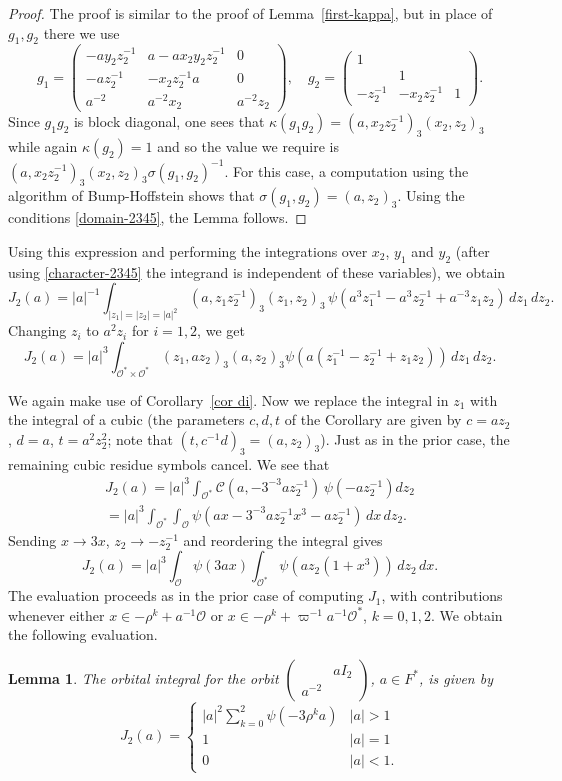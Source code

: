 \documentclass[12pt]{amsart}
\newcommand{\abs}[1]{\left|{#1}\right|}
\renewcommand{\O}{\mathcal{O}}
\newcommand{\Cu}{\mathcal{C}}
\newtheorem{lemma}[theorem]{Lemma}
\theoremstyle{remark}
\begin{document}
\begin{proof} The proof is similar to the proof of Lemma~\ref{first-kappa}, but in place of $g_1,g_2$ there we use
$$g_1=\begin{pmatrix} -ay_2z_2^{-1}&a-ax_2y_2z_2^{-1}&0\\-az_2^{-1}&-x_2z_2^{-1}a&0\\a^{-2}&a^{-2}x_2&a^{-2}z_2\end{pmatrix},\quad
g_2=\begin{pmatrix}1&&\\&1&\\-z_2^{-1}&-x_2z_2^{-1}&1\end{pmatrix}.$$
Since $g_1g_2$ is block diagonal, one sees that $\kappa(g_1g_2)=(a,x_2z_2^{-1})_3(x_2,z_2)_3$ while again $\kappa(g_2)=1$ and so the value we require is 
$(a,x_2z_2^{-1})_3(x_2,z_2)_3\sigma(g_1,g_2)^{-1}$. For this case, a computation using the algorithm of Bump-Hoffstein shows 
that $\sigma(g_1,g_2)=(a,z_2)_3$.  Using the conditions \eqref{domain-2345}, the Lemma follows.
\end{proof}


Using this expression and performing the integrations over $x_2$, $y_1$ and $y_2$ (after using \eqref{character-2345} the integrand is independent of these variables), we obtain
$$J_2(a)=\abs{a}^{-1}\int_{\abs{z_1}=\abs{z_2}=\abs{a}^2} (a,z_1z_2^{-1})_3(z_1,z_2)_3\,  \psi(a^3z_1^{-1}-a^3z_2^{-1}+a^{-3}z_1z_2)\,dz_1\,dz_2.$$
Changing $z_i$ to $a^2z_i$ for $i=1,2$, we get
$$J_2(a)=\abs{a}^{3}\int_{\O^*\times\O^*} (z_1,az_2)_3 (a,z_2)_3 \psi(a(z_1^{-1}-z_2^{-1}+z_1z_2))\,dz_1\,dz_2.$$

We again make use of Corollary~\ref{cor di}.  Now we replace the integral in $z_1$  with the integral of a cubic 
(the parameters $c,d,t$ of the Corollary are given by $c=a z_2$, $d=a$, $t=a^2z_2^2$; note that $(t,c^{-1}d)_3=(a,z_2)_3$).  
Just as in the prior case, the remaining cubic residue symbols cancel. We see that
\begin{multline*}
J_2(a)=\abs{a}^{3}\int_{\O^*} \Cu(a,-3^{-3}az_2^{-1})\, \psi(-az_2^{-1})dz_2\\
=\abs{a}^3\int_{\O^*}\int_{\O} \psi(ax-3^{-3}az_2^{-1}x^3-az_2^{-1})\,dx\,dz_2.
\end{multline*}
Sending $x\to 3x$, $z_2\to -z_2^{-1}$ and reordering the integral gives
$$J_2(a)=
\abs{a}^3\int_{\O}\psi(3ax)\int_{\O^*} \psi(az_2(1+x^3))\,dz_2\,dx.$$
The evaluation proceeds as in the prior case of computing $J_1$, with contributions whenever either $x\in -\rho^k+a^{-1}\O$ or $x\in -\rho^k+\varpi^{-1}a^{-1}\O^*$, $k=0,1,2$. We obtain the following evaluation.
\begin{lemma}  The orbital integral for the orbit $\begin{pmatrix}  & aI_2  \\ a^{-2}   & \end{pmatrix}$, $a\in F^*$, is given by
$$J_2(a)=\begin{cases} \abs{a}^{2}\sum_{k=0}^2 \psi(-3\rho^ka)&\abs{a}>1\\
1&\abs{a}=1\\
0&\abs{a}<1.
\end{cases}$$
\end{lemma}
\end{document}
